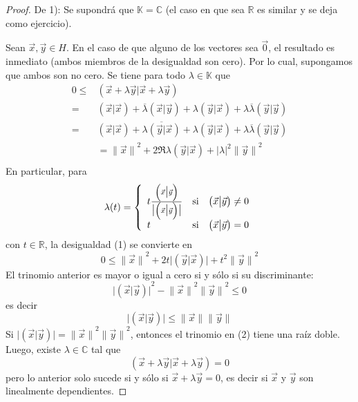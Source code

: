 \documentclass[12pt]{report}
\theoremstyle{largebreak}
\newcommand\abs[1]{\ensuremath{\big|#1\big|}}
\newcommand\norm[1]{\ensuremath{\|#1\|}}
\newcommand\pint[2]{\ensuremath{\left(#1\big| #2\right)}}
\newcommand\conj[1]{\ensuremath{\overline{#1}}}
\begin{document}
    \begin{proof}
        De 1): Se supondrá que $\mathbb{K}=\mathbb{C}$ (el caso en que sea $\mathbb{R}$ es similar y se deja como ejercicio).

        Sean $\vec{x},\vec{y}\in H$. En el caso de que alguno de los vectores sea $\vec{0}$, el resultado es inmediato (ambos miembros de la desigualdad son cero). Por lo cual, supongamos que ambos son no cero. Se tiene para todo $\lambda\in\mathbb{K}$ que
        \begin{equation}
            \begin{split}
                0\leq& \pint{\vec{x}+\lambda\vec{y}}{\vec{x}+\lambda\vec{y}}\\
                =& \pint{\vec{x}}{\vec{x}}+\conj{\lambda}\pint{\vec{x}}{\vec{y}}+\lambda\pint{\vec{y}}{\vec{x}}+\lambda\conj{\lambda}\pint{\vec{y}}{\vec{y}}\\
                =& \pint{\vec{x}}{\vec{x}}+\conj{\lambda\pint{\vec{y}}{\vec{x}}}+\lambda\pint{\vec{y}}{\vec{x}}+\lambda\conj{\lambda}\pint{\vec{y}}{\vec{y}}\\
                &= \norm{\vec{x}}^2+2\Re{\lambda\pint{\vec{y}}{\vec{x}}}+\abs{\lambda}^2\norm{\vec{y}}^2\\
            \end{split}
        \end{equation}
        En particular, para
        \begin{equation*}
            \lambda(t)=\left\{\begin{array}{lcr}
                    t\frac{\pint{\vec{x}}{\vec{y}}}{\abs{\pint{\vec{x}}{\vec{y}}}} & \textup{si} & \pint{\vec{x}}{\vec{y}}\neq0\\
                    t & \textup{si} & \pint{\vec{x}}{\vec{y}}=0
                \end{array}
            \right.
        \end{equation*}
        con $t\in\mathbb{R}$, la desigualdad (1) se convierte en
        \begin{equation}
            0\leq\norm{\vec{x}}^2+2t\abs{\pint{\vec{y}}{\vec{x}}}+t^2\norm{\vec{y}}^2
        \end{equation}
        El trinomio anterior es mayor o igual a cero si y sólo si su discriminante:
        \begin{equation*}
            \abs{\pint{\vec{x}}{\vec{y}}}^2-\norm{\vec{x}}^2\norm{\vec{y}}^2\leq0
        \end{equation*}
        es decir
        \begin{equation*}
            \abs{\pint{\vec{x}}{\vec{y}}}\leq\norm{\vec{x}}\norm{\vec{y}}
        \end{equation*}
        Si $\abs{\pint{\vec{x}}{\vec{y}}}=\norm{\vec{x}}^2\norm{\vec{y}}^2$, entonces el trinomio en (2) tiene una raíz doble. Luego, existe $\lambda\in\mathbb{C}$ tal que
        \begin{equation*}
            \pint{\vec{x}+\lambda\vec{y}}{\vec{x}+\lambda\vec{y}}=0
        \end{equation*}
        pero lo anterior solo sucede si y sólo si $\vec{x}+\lambda\vec{y}=0$, es decir si $\vec{x}$ y $\vec{y}$ son linealmente dependientes.


\end{proof}
\end{document}
